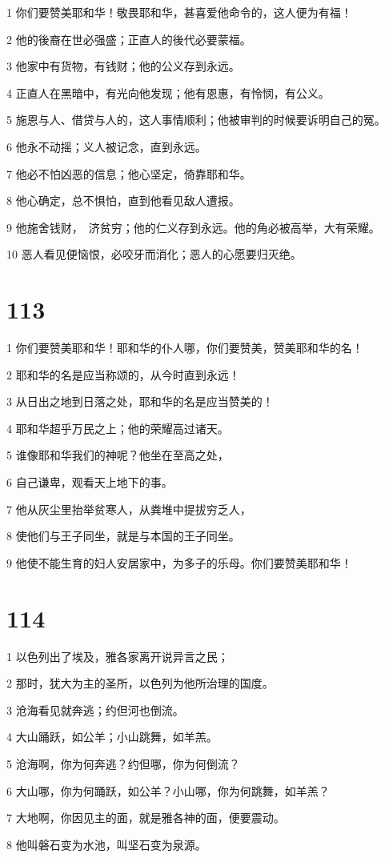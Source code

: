 \par 1 你们要赞美耶和华！敬畏耶和华，甚喜爱他命令的，这人便为有福！
\par 2 他的後裔在世必强盛；正直人的後代必要蒙福。
\par 3 他家中有货物，有钱财；他的公义存到永远。
\par 4 正直人在黑暗中，有光向他发现；他有恩惠，有怜悯，有公义。
\par 5 施恩与人、借贷与人的，这人事情顺利；他被审判的时候要诉明自己的冤。
\par 6 他永不动摇；义人被记念，直到永远。
\par 7 他必不怕凶恶的信息；他心坚定，倚靠耶和华。
\par 8 他心确定，总不惧怕，直到他看见敌人遭报。
\par 9 他施舍钱财，　济贫穷；他的仁义存到永远。他的角必被高举，大有荣耀。
\par 10 恶人看见便恼恨，必咬牙而消化；恶人的心愿要归灭绝。

\chapter{113}

\par 1 你们要赞美耶和华！耶和华的仆人哪，你们要赞美，赞美耶和华的名！
\par 2 耶和华的名是应当称颂的，从今时直到永远！
\par 3 从日出之地到日落之处，耶和华的名是应当赞美的！
\par 4 耶和华超乎万民之上；他的荣耀高过诸天。
\par 5 谁像耶和华我们的神呢？他坐在至高之处，
\par 6 自己谦卑，观看天上地下的事。
\par 7 他从灰尘里抬举贫寒人，从粪堆中提拔穷乏人，
\par 8 使他们与王子同坐，就是与本国的王子同坐。
\par 9 他使不能生育的妇人安居家中，为多子的乐母。你们要赞美耶和华！

\chapter{114}

\par 1 以色列出了埃及，雅各家离开说异言之民；
\par 2 那时，犹大为主的圣所，以色列为他所治理的国度。
\par 3 沧海看见就奔逃；约但河也倒流。
\par 4 大山踊跃，如公羊；小山跳舞，如羊羔。
\par 5 沧海啊，你为何奔逃？约但哪，你为何倒流？
\par 6 大山哪，你为何踊跃，如公羊？小山哪，你为何跳舞，如羊羔？
\par 7 大地啊，你因见主的面，就是雅各神的面，便要震动。
\par 8 他叫磐石变为水池，叫坚石变为泉源。

